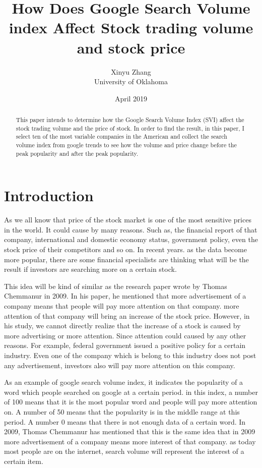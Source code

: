 \documentclass[12pt]{article}
\title{How Does Google Search Volume index Affect Stock trading volume and stock price }
\date{April 2019}
\author{Xinyu Zhang\\ University of Oklahoma}
\begin{document}
\maketitle
\begin{abstract}
This paper intends to determine how the Google Search Volume Index (SVI) affect the stock trading volume and the price of stock. In order to find the result, in this paper, I select ten of the most variable companies in the American and collect the search volume index from google trends to see how the volume and price change before the peak popularity and after the peak popularity. 



\end{abstract}

\section{Introduction} 

As we all know that price of the stock market is one of the most sensitive prices in the world. It could cause by many reasons. Such as, the financial report of that company, international and domestic economy status, government policy, even the stock price of their competitors and so on. In recent years. as the data become more popular, there are some financial specialists are thinking what will be the result if investors are searching more on a certain stock. 
\newline

\newline
This idea will be kind of similar as the research paper wrote by Thomas Chemmanur in 2009. In his paper, he mentioned that more advertisement of a company means that people will pay more attention on that company. more attention of that company will bring an increase of the stock price\cite{chemmanur2019advertising}. However, in his study, we cannot directly realize that the increase of a stock is caused by more advertising or more attention. Since attention could caused by any other reasons. For example, federal government issued a positive policy for a certain industry. Even one of the company which is belong to this industry does not post any advertisement, investors also will pay more attention on this company. 
\newline

\newline
As an example of google search volume index, it indicates the popularity of a word which people searched on google at a certain period. in this index, a number of 100 means that it is the most popular word and people will pay more attention on. A number of 50 means that the popularity is in the middle range at this period. A number 0 means that there is not enough data of a certain word. In 2009, Thomas Chemmanur has mentioned that this is the same idea that in 2009 more advertisement of a company means more interest of that company. as today most people are on the internet, search volume will represent the interest of a certain item. 
\end{document}
